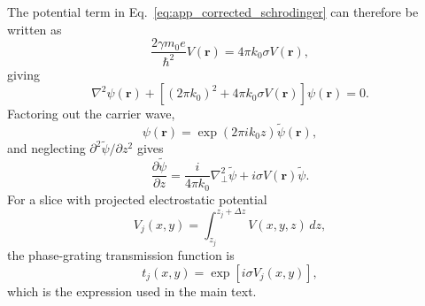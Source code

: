 The potential term in Eq.~\eqref{eq:app_corrected_schrodinger} can therefore be
written as
\begin{equation}
\frac{2\gamma m_0e}{\hbar^2}V(\mathbf r)
=
4\pi k_0\sigma V(\mathbf r),
\label{eq:app_potential_term_sigma}
\end{equation}
giving
\begin{equation}
\nabla^2\psi(\mathbf r)
+
\left[
(2\pi k_0)^2
+
4\pi k_0\sigma V(\mathbf r)
\right]\psi(\mathbf r)
=0.
\label{eq:app_corrected_schrodinger_sigma}
\end{equation}
Factoring out the carrier wave,
\begin{equation}
\psi(\mathbf r)
=
\exp(2\pi i k_0z)\tilde\psi(\mathbf r),
\label{eq:app_carrier_wave}
\end{equation}
and neglecting $\partial^2\tilde\psi/\partial z^2$ gives
\begin{equation}
\frac{\partial\tilde\psi}{\partial z}
=
\frac{i}{4\pi k_0}\nabla_\perp^2\tilde\psi
+
i\sigma V(\mathbf r)\tilde\psi.
\label{eq:app_paraxial_sigma}
\end{equation}
For a slice with projected electrostatic potential
\begin{equation}
V_j(x,y)
=
\int_{z_j}^{z_j+\Delta z}V(x,y,z)\,dz,
\label{eq:app_projected_potential}
\end{equation}
the phase-grating transmission function is
\begin{equation}
t_j(x,y)
=
\exp\left[i\sigma V_j(x,y)\right],
\label{eq:app_transmission_function}
\end{equation}
which is the expression used in the main text.
